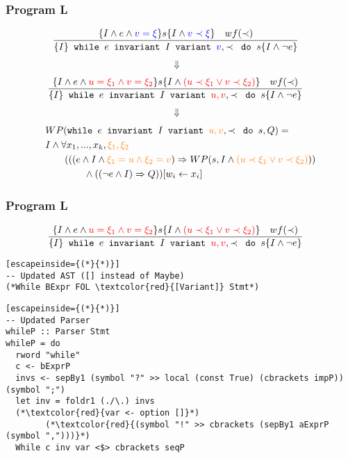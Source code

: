 \begin{frame}[containsverbatim]
  \frametitle{Program L}
\begin{align*}
  &\frac{
    \{I \land e \land \textcolor{blue}{v = \xi} \} s \{I \land \textcolor{blue}{v \prec \xi} \} \quad wf(\prec)
  }{
    \{I\} \texttt{ while } e \texttt{ invariant } I
          \texttt{ variant } \textcolor{blue}{v}, \prec \texttt{ do } s \{I \land \neg e\}
  }
\end{align*}
\begin{align*}
  \Downarrow &
\end{align*}
\begin{align*}
  &\frac{
    \{I \land e \land \textcolor{red}{u = \xi_{1} \land v = \xi_{2}} \} s \{I \land \textcolor{red}{(u \prec \xi_{1} \lor v \prec \xi_{2})} \} \quad wf(\prec)
  }{
    \{I\} \texttt{ while } e \texttt{ invariant } I
          \texttt{ variant } \textcolor{red}{u,v} , \prec \texttt{ do } s \{I \land \neg e\}
  }
\end{align*}
\begin{align*}
  \Downarrow &
\end{align*}
\begin{align*}
&WP(
    \texttt{while } e \texttt{ invariant } I
    \texttt{ variant } \textcolor{orange}{u,v}, \prec \texttt{ do } s
, Q)
=\\
&I \land \forall x_1, ..., x_k, \textcolor{orange}{\xi_{1}, \xi_{2}}\\
&\quad \quad (((e \land I \land \textcolor{orange}{\xi_{1} = u \land \xi_{2} = v}) \Rightarrow WP(s, I \land \textcolor{orange}{(u \prec \xi_{1} \lor v \prec \xi_{2})})) \\
&\quad \quad \quad \quad \land ((\neg e \land I) \Rightarrow Q)) [w_i \leftarrow x_i] \\
\end{align*}
\end{frame}

\begin{frame}[containsverbatim]
  \frametitle{Program L}
\begin{align*}
  &\frac{
    \{I \land e \land \textcolor{red}{u = \xi_{1} \land v = \xi_{2}} \} s \{I \land \textcolor{red}{(u \prec \xi_{1} \lor v \prec \xi_{2})} \} \quad wf(\prec)
  }{
    \{I\} \texttt{ while } e \texttt{ invariant } I
          \texttt{ variant } \textcolor{red}{u,v} , \prec \texttt{ do } s \{I \land \neg e\}
  }
\end{align*}
\begin{lstlisting}[escapeinside={(*}{*)}]
-- Updated AST ([] instead of Maybe)
(*While BExpr FOL \textcolor{red}{[Variant]} Stmt*)
\end{lstlisting}

\begin{lstlisting}[escapeinside={(*}{*)}]
-- Updated Parser
whileP :: Parser Stmt
whileP = do
  rword "while"
  c <- bExprP
  invs <- sepBy1 (symbol "?" >> local (const True) (cbrackets impP)) (symbol ";")
  let inv = foldr1 (./\.) invs
  (*\textcolor{red}{var <- option []}*)
        (*\textcolor{red}{(symbol "!" >> cbrackets (sepBy1 aExprP (symbol ",")))}*)
  While c inv var <$> cbrackets seqP
\end{lstlisting}
\end{frame}

